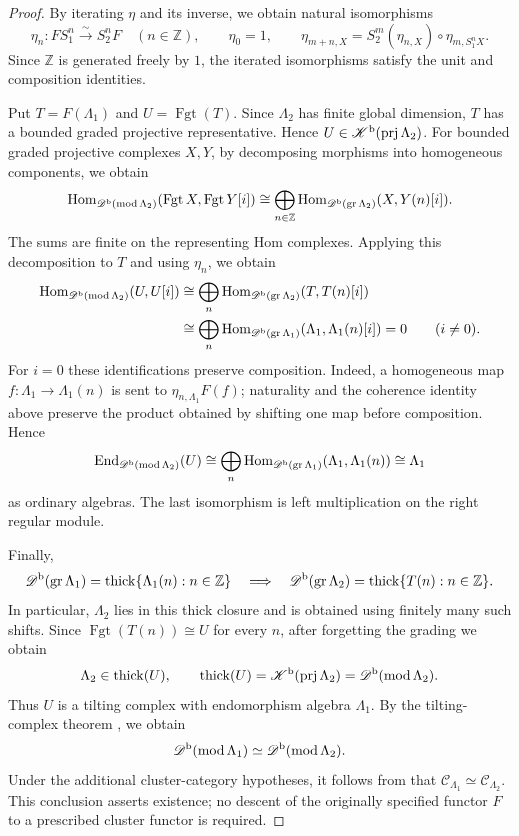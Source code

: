 \documentclass[12pt,a4paper,english,reqno]{amsart}
\theoremstyle{plain}
\theoremstyle{definition}
\numberwithin{equation}{section}
\def\et{\eta}
\def\La{\Lambda}
\def\Hom{\operatorname{Hom}}
\def\End{\operatorname{End}}
\def\prj{\operatorname{prj}}
\def\thick{\operatorname{thick}}
\def\Kb{{\mathcal K}^{\text{\rm b}}}
\def\Db{{\mathcal D}^{\text{\rm b}}}
\def\calC{{\mathcal C}}
\def\bbZ{{\mathbb Z}}
\def\iso{\cong}
\def\Ds{\bigoplus}
\def\ya#1{\xrightarrow{#1}}
\newcommand{\Fgt}{\operatorname{Fgt}}
\def\gr{\operatorname{gr}}
\begin{document}
\begin{proof}
By iterating $\et$ and its inverse, we obtain natural isomorphisms
\[
 \et_n:FS_1^n\ya{\sim}S_2^nF\quad(n\in\bbZ),
 \qquad \et_0=1,
 \qquad
 \et_{m+n,X}=S_2^m(\et_{n,X})\circ\et_{m,S_1^nX}.
\]
Since $\bbZ$ is generated freely by $1$, the iterated isomorphisms satisfy the unit and composition identities.

Put $T=F(\La_1)$ and $U=\Fgt(T)$. Since $\La_2$ has finite global dimension, $T$ has a bounded graded projective representative. Hence $U\in \Kb(\prj\La_2)$. For bounded graded projective complexes $X,Y$, by decomposing morphisms into homogeneous components, we obtain
\[
 \Hom_{\Db(\operatorname{mod}\La_2)}(\Fgt X,\Fgt Y[i])
 \iso\Ds_{n\in\bbZ}
 \Hom_{\Db(\gr\La_2)}(X,Y(n)[i]).
\]
The sums are finite on the representing Hom complexes. Applying this decomposition to $T$ and using $\et_n$, we obtain
\begin{align*}
 \Hom_{\Db(\operatorname{mod}\La_2)}(U,U[i])
 &\iso\Ds_n\Hom_{\Db(\gr\La_2)}(T,T(n)[i])\\
 &\iso\Ds_n\Hom_{\Db(\gr\La_1)}
              (\La_1,\La_1(n)[i])=0\qquad(i\ne0).
\end{align*}
For $i=0$ these identifications preserve composition. Indeed, a homogeneous map $f:\La_1\to\La_1(n)$ is sent to $\et_{n,\La_1}F(f)$; naturality and the coherence identity above preserve the product obtained by shifting one map before composition. Hence
\[
 \End_{\Db(\operatorname{mod}\La_2)}(U)
 \iso\Ds_n\Hom_{\Db(\gr\La_1)}
       (\La_1,\La_1(n))
 \iso\La_1
\]
as ordinary algebras. The last isomorphism is left multiplication on the right regular module.

Finally,
\[
 \Db(\gr\La_1)=\thick\{\La_1(n):n\in\bbZ\}
 \quad\Longrightarrow\quad
 \Db(\gr\La_2)=\thick\{T(n):n\in\bbZ\}.
\]
In particular, $\La_2$ lies in this thick closure and is obtained using finitely many such shifts. Since $\Fgt(T(n))\iso U$ for every $n$, after forgetting the grading we obtain
\[
 \La_2\in\thick(U),\qquad
 \thick(U)=\Kb(\prj\La_2)=\Db(\operatorname{mod}\La_2).
\]
Thus $U$ is a tilting complex with endomorphism algebra $\La_1$. By the tilting-complex theorem \cite[Theorem 6.4]{Rickard}, we obtain
\[
 \Db(\operatorname{mod}\La_1)
 \simeq\Db(\operatorname{mod}\La_2).
\]
Under the additional cluster-category hypotheses, it follows from \cite[Proposition 5.2]{AO} that $\calC_{\La_1}\simeq\calC_{\La_2}$. This conclusion asserts existence; no descent of the originally specified functor $F$ to a prescribed cluster functor is required.
\end{proof}
\end{document}
